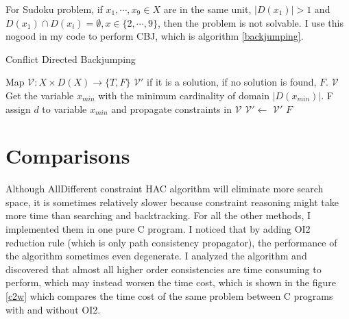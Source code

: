 \documentclass[a4paper, 12pt]{report}
\begin{document}
            For Sudoku problem, if $x_1,\cdots, x_9\in X$ are in the same unit, $|D(x_1)|>1$ and $D(x_1)\cap D(x_i)=\emptyset, x\in\{2,\cdots,9\}$, then the problem is not solvable. I use this nogood in my code to perform CBJ, which is algorithm \ref{backjumping}.

             \begin{algorithm}
                \caption{Conflict Directed Backjumping}
                \label{backjumping}
                \begin{algorithmic}[1]
                    \Require Map $\mathcal V:X\times D(X) \to \{T,F\}$
                    \Ensure $\mathcal V'$ if it is a solution, if no solution is found, $F$.
                            \State \Return $\mathcal V$
                        \EndIf
                        \State Get the variable $x_{min}$ with the minimum cardinality of domain $|D(x_{min})|$.
                                    \State \Return F  
                                \EndIf
                            \EndFor
                            \State assign $d$ to variable $x_{min}$ and propagate constraints in $\mathcal V$
                                \State $\mathcal V'\gets$ 
                                    \State \Return $\mathcal V'$
                                \EndIf
                            \EndIf
                        \EndFor
                        \State \Return $F$
                    \EndFunction
                \end{algorithmic}
            \end{algorithm}
    \section {Comparisons}
        Although AllDifferent constraint HAC algorithm will eliminate more search space, it is sometimes relatively slower because constraint reasoning might take more time than searching and backtracking. For all the other methods, I implemented them in one pure C program. I noticed that by adding OI2 reduction rule (which is only path consistency propagator), the performance of the algorithm sometimes even degenerate. I analyzed the algorithm and discovered that almost all higher order consistencies are
        time consuming to perform, which may instead worsen the time cost, which is shown in the figure \ref{c2w} which compares the time cost of the same problem between C programs with and without OI2.
\end{document}
